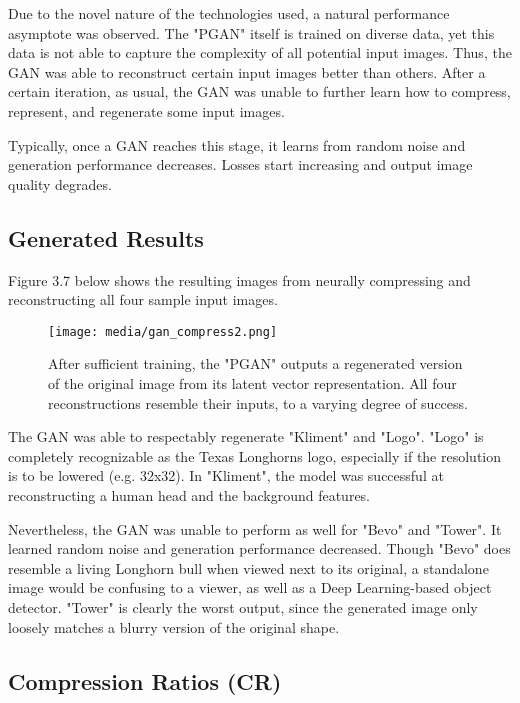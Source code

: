 Due to the novel nature of the technologies used, a natural performance asymptote
was observed. The "PGAN" itself is trained on diverse data, yet this data is not able 
to capture the complexity of all potential input images. 
Thus, the GAN was able to reconstruct certain input images better than others.
After a certain iteration, as usual, the GAN was unable to further learn how to compress,
represent, and regenerate some input images. 

Typically, once a GAN reaches this stage,
it learns from random noise and generation performance decreases.
Losses start increasing and output image quality degrades. 

\subsection{Generated Results}

Figure 3.7 below shows the resulting images from neurally compressing and reconstructing
all four sample input images.

\begin{figure}[H]
	\begin{center}
	\texttt{[image: media/gan\_compress2.png]}
	\end{center}
	\caption[Neural Compression and Generation]{After sufficient training, the "PGAN" outputs a regenerated
    version of the original image from its latent vector representation. All four reconstructions
    resemble their inputs, to a varying degree of success.}
	\end{figure}

The GAN was able to respectably regenerate "Kliment" and "Logo".
"Logo" is completely recognizable as the Texas Longhorns logo, especially if the resolution
is to be lowered (e.g. 32x32). In "Kliment", the model was successful at reconstructing a 
human head and the background features. 

Nevertheless, the GAN was unable to perform as well for "Bevo" and "Tower".
It learned random noise and generation performance decreased.
Though "Bevo" does resemble a living Longhorn bull when viewed next to its original,
a standalone image would be confusing to a viewer, as well as a Deep Learning-based object detector. 
"Tower" is clearly the worst output, since the generated image only loosely matches a blurry 
version of the original shape.

\subsection{Compression Ratios (CR)}

